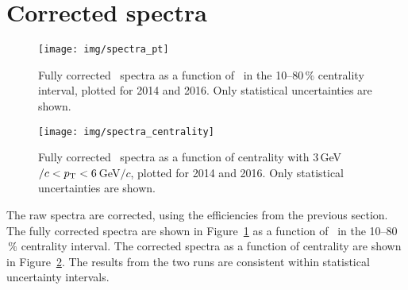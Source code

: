 \section{Corrected spectra}

\begin{figure}[!htb]
\centering
\texttt{[image: img/spectra\_pt]}
\caption[Fully corrected \Lambdac\ spectra as a function of \pt.]{\label{spectraPt} Fully corrected \Lambdac\ spectra as a function of \pt\ in the 10--80$\,\%$ centrality interval, plotted for 2014 and 2016. Only statistical uncertainties are shown.}
\end{figure}

\begin{figure}[!htb]
\centering
\texttt{[image: img/spectra\_centrality]}
\caption[Fully corrected \Lambdac\ spectra as a function of centrality.]{\label{spectraCent} Fully corrected \Lambdac\ spectra as a function of centrality with $3\,$GeV$/c < {p_{\mathrm{T}}} < 6\,$GeV$/c$, plotted for 2014 and 2016. Only statistical uncertainties are shown.}
\end{figure}

The raw spectra are corrected, using the efficiencies from the previous section. The fully corrected spectra are shown in Figure~\ref{spectraPt} as a function of \pt\ in the 10--80$\,\%$ centrality interval. The corrected spectra as a function of centrality are shown in Figure~\ref{spectraCent}\@. The results from the two runs are consistent within statistical uncertainty intervals.


% 
% 



